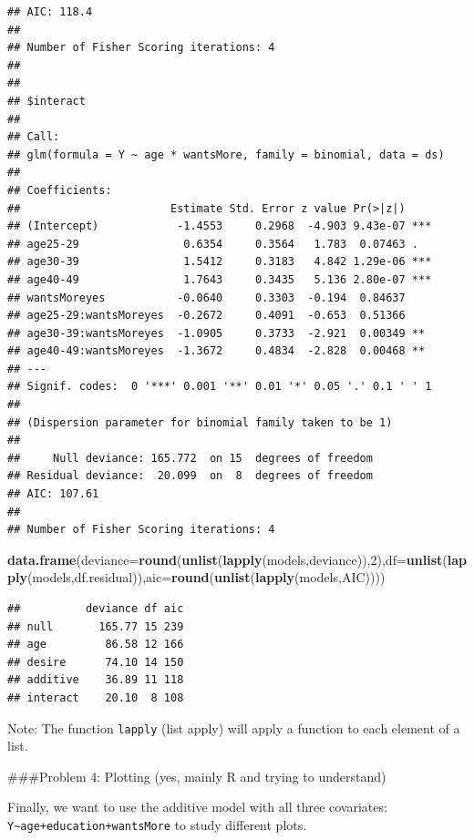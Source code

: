 \documentclass[
]{article}
\newenvironment{Shaded}{\begin{snugshade}}{\end{snugshade}}
\newcommand{\AttributeTok}[1]{\textcolor[rgb]{0.13,0.29,0.53}{#1}}
\newcommand{\DecValTok}[1]{\textcolor[rgb]{0.00,0.00,0.81}{#1}}
\newcommand{\FunctionTok}[1]{\textcolor[rgb]{0.13,0.29,0.53}{\textbf{#1}}}
\newcommand{\NormalTok}[1]{#1}
\begin{document}
\begin{verbatim}
## AIC: 118.4
## 
## Number of Fisher Scoring iterations: 4
## 
## 
## $interact
## 
## Call:
## glm(formula = Y ~ age * wantsMore, family = binomial, data = ds)
## 
## Coefficients:
##                       Estimate Std. Error z value Pr(>|z|)    
## (Intercept)            -1.4553     0.2968  -4.903 9.43e-07 ***
## age25-29                0.6354     0.3564   1.783  0.07463 .  
## age30-39                1.5412     0.3183   4.842 1.29e-06 ***
## age40-49                1.7643     0.3435   5.136 2.80e-07 ***
## wantsMoreyes           -0.0640     0.3303  -0.194  0.84637    
## age25-29:wantsMoreyes  -0.2672     0.4091  -0.653  0.51366    
## age30-39:wantsMoreyes  -1.0905     0.3733  -2.921  0.00349 ** 
## age40-49:wantsMoreyes  -1.3672     0.4834  -2.828  0.00468 ** 
## ---
## Signif. codes:  0 '***' 0.001 '**' 0.01 '*' 0.05 '.' 0.1 ' ' 1
## 
## (Dispersion parameter for binomial family taken to be 1)
## 
##     Null deviance: 165.772  on 15  degrees of freedom
## Residual deviance:  20.099  on  8  degrees of freedom
## AIC: 107.61
## 
## Number of Fisher Scoring iterations: 4
\end{verbatim}

\begin{Shaded}
\begin{Highlighting}[]
\FunctionTok{data.frame}\NormalTok{(}\AttributeTok{deviance=}\FunctionTok{round}\NormalTok{(}\FunctionTok{unlist}\NormalTok{(}\FunctionTok{lapply}\NormalTok{(models,deviance)),}\DecValTok{2}\NormalTok{),}\AttributeTok{df=}\FunctionTok{unlist}\NormalTok{(}\FunctionTok{lapply}\NormalTok{(models,df.residual)),}\AttributeTok{aic=}\FunctionTok{round}\NormalTok{(}\FunctionTok{unlist}\NormalTok{(}\FunctionTok{lapply}\NormalTok{(models,AIC))))}
\end{Highlighting}
\end{Shaded}

\begin{verbatim}
##          deviance df aic
## null       165.77 15 239
## age         86.58 12 166
## desire      74.10 14 150
## additive    36.89 11 118
## interact    20.10  8 108
\end{verbatim}

Note: The function \texttt{lapply} (list apply) will apply a function to
each element of a list.

\#\#\#Problem 4: Plotting (yes, mainly R and trying to understand)

Finally, we want to use the additive model with all three covariates:
\texttt{Y\textasciitilde{}age+education+wantsMore} to study different
plots.
\end{document}
